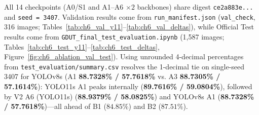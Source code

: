 All 14 checkpoints (A0/S1 and A1--A6 $\times 2$ backbones) share digest \texttt{ce2a883e...} and \texttt{seed = 3407}. Validation results come from \nolinkurl{run_manifest.json} (\texttt{val\_check}, 316 images; Tables~\ref{tab:ch6_val_y11}--\ref{tab:ch6_val_deltas}), while Official Test results come from \nolinkurl{GDUT_final_test_evaluation.ipynb} (1,587 images; Tables~\ref{tab:ch6_test_y11}--\ref{tab:ch6_test_deltas}, Figure~\ref{fig:ch6_ablation_val_test}). Using unrounded 4-decimal percentages from \nolinkurl{test_evaluation/summary.csv} resolves the 1-decimal tie on single-seed 3407 for YOLOv8s (A1 \textbf{88.7328\% / 57.7618\%} vs. A3 \textbf{88.7305\% / 57.1614\%}): YOLO11s A1 peaks internally (\textbf{89.7616\% / 59.0804\%}), followed by V2 A6 (YOLO11s) (\textbf{88.9379\% / 58.0825\%}) and YOLOv8s A1 (\textbf{88.7328\% / 57.7618\%})---all ahead of B1 ($84.85\%$) and B2 ($87.51\%$).

\begin{table}[htbp]
\centering
\caption{GDUT-HWD Validation Results (316 Images) for YOLO11s Across Configurations A0--A6.}
\label{tab:ch6_val_y11}
\footnotesize
\renewcommand{\arraystretch}{1.10}
\end{table}

